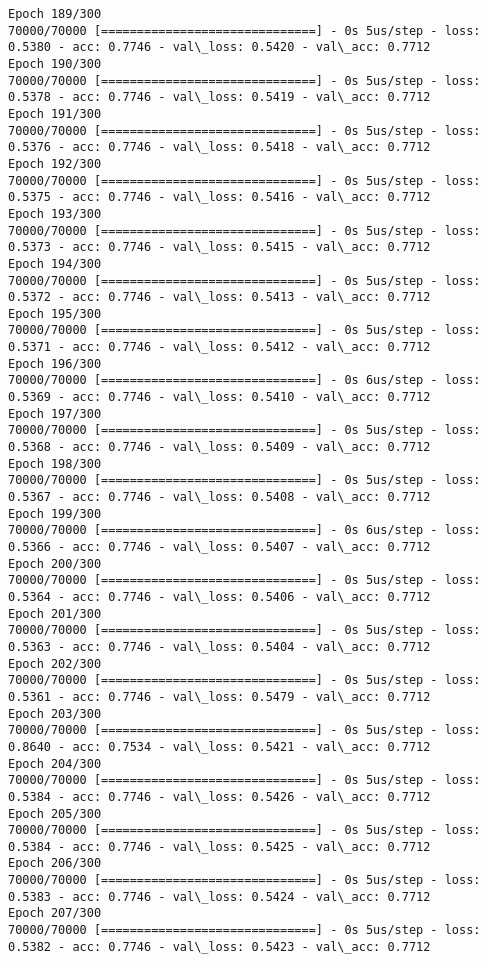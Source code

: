 \documentclass[11pt]{article}
\begin{document}
\begin{Verbatim}[commandchars=\\\{\}]
Epoch 189/300
70000/70000 [==============================] - 0s 5us/step - loss: 0.5380 - acc: 0.7746 - val\_loss: 0.5420 - val\_acc: 0.7712
Epoch 190/300
70000/70000 [==============================] - 0s 5us/step - loss: 0.5378 - acc: 0.7746 - val\_loss: 0.5419 - val\_acc: 0.7712
Epoch 191/300
70000/70000 [==============================] - 0s 5us/step - loss: 0.5376 - acc: 0.7746 - val\_loss: 0.5418 - val\_acc: 0.7712
Epoch 192/300
70000/70000 [==============================] - 0s 5us/step - loss: 0.5375 - acc: 0.7746 - val\_loss: 0.5416 - val\_acc: 0.7712
Epoch 193/300
70000/70000 [==============================] - 0s 5us/step - loss: 0.5373 - acc: 0.7746 - val\_loss: 0.5415 - val\_acc: 0.7712
Epoch 194/300
70000/70000 [==============================] - 0s 5us/step - loss: 0.5372 - acc: 0.7746 - val\_loss: 0.5413 - val\_acc: 0.7712
Epoch 195/300
70000/70000 [==============================] - 0s 5us/step - loss: 0.5371 - acc: 0.7746 - val\_loss: 0.5412 - val\_acc: 0.7712
Epoch 196/300
70000/70000 [==============================] - 0s 6us/step - loss: 0.5369 - acc: 0.7746 - val\_loss: 0.5410 - val\_acc: 0.7712
Epoch 197/300
70000/70000 [==============================] - 0s 5us/step - loss: 0.5368 - acc: 0.7746 - val\_loss: 0.5409 - val\_acc: 0.7712
Epoch 198/300
70000/70000 [==============================] - 0s 5us/step - loss: 0.5367 - acc: 0.7746 - val\_loss: 0.5408 - val\_acc: 0.7712
Epoch 199/300
70000/70000 [==============================] - 0s 6us/step - loss: 0.5366 - acc: 0.7746 - val\_loss: 0.5407 - val\_acc: 0.7712
Epoch 200/300
70000/70000 [==============================] - 0s 5us/step - loss: 0.5364 - acc: 0.7746 - val\_loss: 0.5406 - val\_acc: 0.7712
Epoch 201/300
70000/70000 [==============================] - 0s 5us/step - loss: 0.5363 - acc: 0.7746 - val\_loss: 0.5404 - val\_acc: 0.7712
Epoch 202/300
70000/70000 [==============================] - 0s 5us/step - loss: 0.5361 - acc: 0.7746 - val\_loss: 0.5479 - val\_acc: 0.7712
Epoch 203/300
70000/70000 [==============================] - 0s 5us/step - loss: 0.8640 - acc: 0.7534 - val\_loss: 0.5421 - val\_acc: 0.7712
Epoch 204/300
70000/70000 [==============================] - 0s 5us/step - loss: 0.5384 - acc: 0.7746 - val\_loss: 0.5426 - val\_acc: 0.7712
Epoch 205/300
70000/70000 [==============================] - 0s 5us/step - loss: 0.5384 - acc: 0.7746 - val\_loss: 0.5425 - val\_acc: 0.7712
Epoch 206/300
70000/70000 [==============================] - 0s 5us/step - loss: 0.5383 - acc: 0.7746 - val\_loss: 0.5424 - val\_acc: 0.7712
Epoch 207/300
70000/70000 [==============================] - 0s 5us/step - loss: 0.5382 - acc: 0.7746 - val\_loss: 0.5423 - val\_acc: 0.7712

\end{Verbatim}
\end{document}
